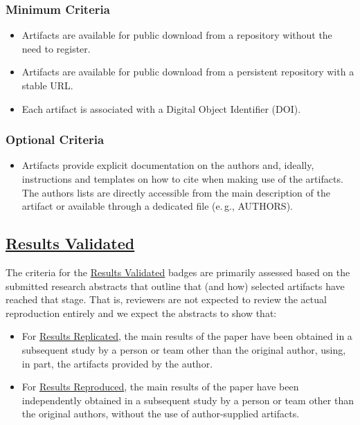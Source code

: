 \documentclass[twoside,a4paper]{refart}
\newcommand{\eg}{e.\,g.,\xspace}
\newcommand{\validated}{\protect\hyperlink{validated}{Results Validated}\xspace}
\newcommand{\reproduced}{\protect\hyperlink{reproduced}{Results Reproduced}\xspace}
\newcommand{\replicated}{\protect\hyperlink{replicated}{Results Replicated}\xspace}
\begin{document}
\subsubsection{Minimum Criteria}

\begin{itemize}
\item[\Checkedbox] Artifacts are available for public download from a
  repository without the need to register.
\item[\Checkedbox] Artifacts are available for public download from a
  persistent repository with a stable URL.
\item[\Checkedbox] Each artifact is associated with a Digital Object
  Identifier (DOI).
\end{itemize}

\subsubsection{Optional Criteria}

\begin{itemize}
\item[\Checkedbox] Artifacts provide explicit documentation on the
  authors and, ideally, instructions and templates on how to cite when
  making use of the artifacts. The authors lists are directly
  accessible from the main description of the artifact or available
  through a dedicated file (\eg AUTHORS).
\end{itemize}
  
\subsection{\validated}

The criteria for the \validated badges are primarily assessed based on
the submitted research abstracts that outline that (and how) selected
artifacts have reached that stage. That is, reviewers are not expected
to review the actual reproduction entirely and we expect the abstracts
to show that:

\begin{itemize}
\item[\Checkedbox] For \replicated, the main results of the paper have
  been obtained in a subsequent study by a person or team other than
  the original author, using, in part, the artifacts provided by the
  author.
\item[\Checkedbox] For \reproduced, the main results of the paper have
  been independently obtained in a subsequent study by a person or
  team other than the original authors, without the use of
  author-supplied artifacts.
\end{itemize}
\end{document}

